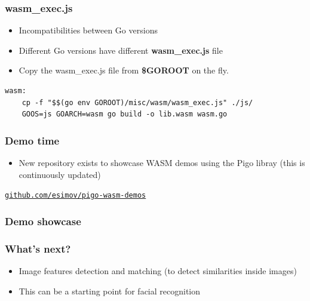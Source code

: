 \documentclass[9pt]{beamer}
\newcommand{\myblue} [1] {{\color{blue}#1}}
\begin{document}
\begin{frame}[fragile]
\frametitle{wasm\_exec.js}


\begin{itemize}
\item Incompatibilities between Go versions
\item Different Go versions have different \textbf{wasm\_exec.js} file
\item Copy the wasm\_exec.js file from \textbf{\$GOROOT} on the fly.
\end{itemize}


\begin{verbatim}
wasm:
    cp -f "$$(go env GOROOT)/misc/wasm/wasm_exec.js" ./js/
    GOOS=js GOARCH=wasm go build -o lib.wasm wasm.go

\end{verbatim}



\end{frame}

\begin{frame}[fragile]
\frametitle{Demo time}


\begin{itemize}
\item New repository exists to showcase WASM demos using the Pigo libray (this is continuously updated)
\end{itemize}

\myblue{\href{https://github.com/esimov/pigo-wasm-demos}{\texttt{github.com/esimov/pigo-wasm-demos}}}


\end{frame}

\begin{frame}[fragile]
\frametitle{Demo showcase}


\end{frame}

\begin{frame}[fragile]
\frametitle{What's next?}


\begin{itemize}
\item Image features detection and matching (to detect similarities inside images)
\item This can be a starting point for facial recognition
\end{itemize}


\end{frame}
\end{document}
